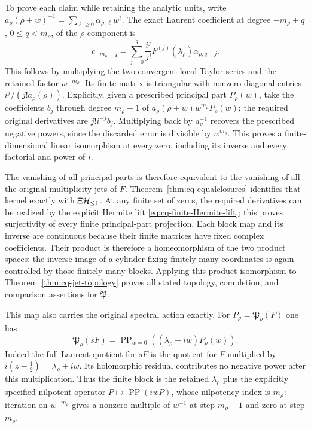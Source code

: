 To prove each claim while retaining the analytic units, write
$a_\rho(\rho+w)^{-1}=\sum_{\ell\geq0}\alpha_{\rho,\ell}w^\ell$.
The exact Laurent coefficient at degree $-m_\rho+q$, $0\leq q<m_\rho$,
of the $\rho$ component is
\begin{equation}\label{eq:cq-principalpart-coefficients}
 c_{-m_\rho+q}
 =\sum_{j=0}^{q}\frac{i^j}{j!}F^{(j)}(\lambda_\rho)
                                  \alpha_{\rho,q-j}.
\end{equation}
This follows by multiplying the two convergent local Taylor
series and the retained factor $w^{-m_\rho}$. Its finite matrix
is triangular with nonzero diagonal entries
$i^j/(j!a_\rho(\rho))$. Explicitly, given a prescribed principal
part $P_\rho(w)$, take the coefficients $b_j$ through degree
$m_\rho-1$ of $a_\rho(\rho+w)w^{m_\rho}P_\rho(w)$;
the required original derivatives are $j!i^{-j}b_j$.
Multiplying back by $a_\rho^{-1}$ recovers the prescribed negative
powers, since the discarded error is divisible by $w^{m_\rho}$.
This proves a finite-dimensional linear isomorphism at every zero,
including its inverse and every factorial and power of $i$.

The vanishing of all principal parts is therefore equivalent to
the vanishing of all the original multiplicity jets of $F$.
Theorem~\ref{thm:cq-equalclosures} identifies that kernel exactly
with $\Xi\mathcal H_{\leq 1}$. At any finite set of zeros, the required derivatives
can be realized by the explicit Hermite lift
\eqref{eq:cq-finite-Hermite-lift}; this proves surjectivity of
every finite principal-part projection. Each block map and its
inverse are continuous because their finite matrices have fixed
complex coefficients. Their product is therefore a homeomorphism
of the two product spaces: the inverse image of a cylinder fixing
finitely many coordinates is again controlled by those finitely
many blocks. Applying this product isomorphism to
Theorem~\ref{thm:cq-jet-topology} proves all stated topology,
completion, and comparison assertions for $\mathfrak P$.

This map also carries the original spectral action exactly. For
$P_\rho=\mathfrak P_\rho(F)$ one has
\begin{equation}\label{eq:cq-s-principalparts}
 \mathfrak P_\rho(sF)
 =\operatorname{PP}_{w=0}
                  ((\lambda_\rho+iw)P_\rho(w)).
\end{equation}
Indeed the full Laurent quotient for $sF$ is the quotient for $F$
multiplied by $i(z-\tfrac12)=\lambda_\rho+iw$.
Its holomorphic residual contributes no negative power after this
multiplication. Thus the finite block is the retained
$\lambda_\rho$ plus the explicitly specified nilpotent operator
$P\mapsto\operatorname{PP}(iwP)$, whose nilpotency index is
$m_\rho$: iteration on $w^{-m_\rho}$ gives a nonzero multiple
of $w^{-1}$ at step $m_\rho-1$ and zero at step $m_\rho$.

